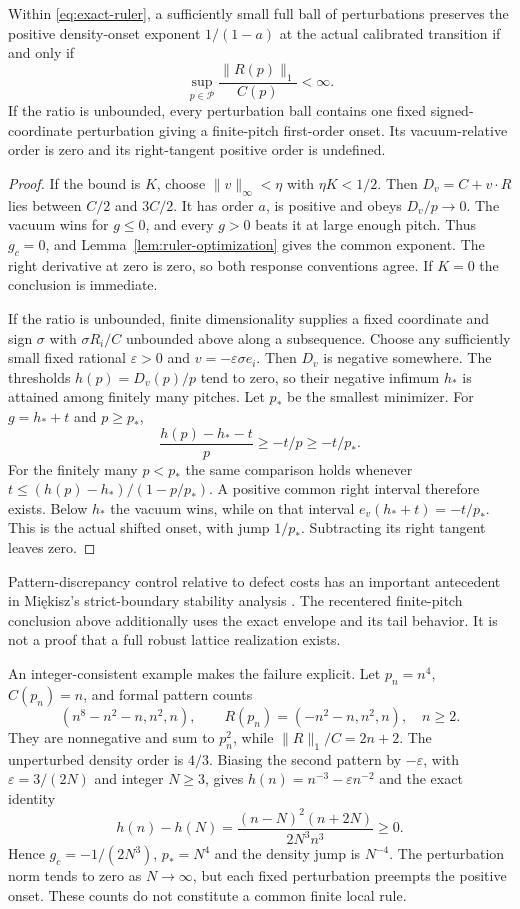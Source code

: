 \begin{theorem}\label{thm:ruler-stability}
Within \eqref{eq:exact-ruler}, a sufficiently small full ball of
perturbations preserves the positive density-onset exponent
$1/(1-a)$ at the actual calibrated transition if and only if
\begin{equation}\label{eq:ruler-ratio}
 \sup_{p\in\mathcal P}\frac{\|R(p)\|_1}{C(p)}<\infty.
\end{equation}
If the ratio is unbounded, every perturbation ball contains one
fixed signed-coordinate perturbation giving a finite-pitch
first-order onset. Its vacuum-relative order is zero and its
right-tangent positive order is undefined.
\end{theorem}
\begin{proof}
If the bound is $K$, choose $\|v\|_\infty<\eta$ with
$\eta K<1/2$. Then $D_v=C+v\cdot R$ lies between $C/2$ and
$3C/2$. It has order $a$, is positive and obeys $D_v/p\to0$.
The vacuum wins for $g\leq0$, and every $g>0$ beats it at large
enough pitch. Thus $g_c=0$, and
Lemma~\ref{lem:ruler-optimization} gives the common exponent.
The right derivative at zero is zero, so both response conventions
agree. If $K=0$ the conclusion is immediate.

If the ratio is unbounded, finite dimensionality supplies a fixed
coordinate and sign $\sigma$ with $\sigma R_i/C$ unbounded above
along a subsequence. Choose any sufficiently small fixed rational
$\varepsilon>0$ and $v=-\varepsilon\sigma e_i$.
Then $D_v$ is negative somewhere. The thresholds
$h(p)=D_v(p)/p$ tend to zero, so their negative infimum $h_*$ is
attained among finitely many pitches. Let $p_*$ be the smallest
minimizer. For $g=h_*+t$ and $p\geq p_*$,
\[
 \frac{h(p)-h_*-t}{p}\geq-t/p\geq-t/p_*.
\]
For the finitely many $p<p_*$ the same comparison holds whenever
$t\leq(h(p)-h_*)/(1-p/p_*)$. A positive common right interval
therefore exists. Below $h_*$ the vacuum wins, while on that
interval $e_v(h_*+t)=-t/p_*$. This is the actual shifted onset,
with jump $1/p_*$. Subtracting its right tangent leaves zero.
\end{proof}
Pattern-discrepancy control relative to defect costs has an important
antecedent in Mi\k{e}kisz's strict-boundary stability analysis
\cite{stableQuasicrystals}. The recentered finite-pitch conclusion
above additionally uses the exact envelope and its tail behavior.
It is not a proof that a full robust lattice realization exists.

An integer-consistent example makes the failure explicit. Let
$p_n=n^4$, $C(p_n)=n$, and formal pattern counts
\[
 (n^8-n^2-n,n^2,n),\qquad R(p_n)=(-n^2-n,n^2,n),\quad n\geq2.
\]
They are nonnegative and sum to $p_n^2$, while
$\|R\|_1/C=2n+2$. The unperturbed density order is $4/3$.
Biasing the second pattern by $-\varepsilon$, with
$\varepsilon=3/(2N)$ and integer $N\geq3$, gives
$h(n)=n^{-3}-\varepsilon n^{-2}$ and the exact identity
\[
 h(n)-h(N)=\frac{(n-N)^2(n+2N)}{2N^3n^3}\geq0.
\]
Hence $g_c=-1/(2N^3)$, $p_*=N^4$ and the density jump is $N^{-4}$.
The perturbation norm tends to zero as $N\to\infty$, but each fixed
perturbation preempts the positive onset. These counts do not
constitute a common finite local rule.

